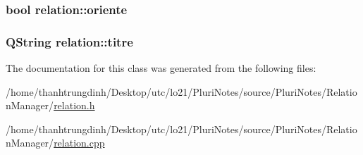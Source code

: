 \subsubsection[{\texorpdfstring{oriente}{oriente}}]{\setlength{\rightskip}{0pt plus 5cm}bool relation\+::oriente\hspace{0.3cm}{\ttfamily [protected]}}\hypertarget{classrelation_a7d9c025d5947d26494321d97049c2bc2}{}\label{classrelation_a7d9c025d5947d26494321d97049c2bc2}
\subsubsection[{\texorpdfstring{titre}{titre}}]{\setlength{\rightskip}{0pt plus 5cm}Q\+String relation\+::titre\hspace{0.3cm}{\ttfamily [protected]}}\hypertarget{classrelation_a6258e8bb61b74f21f592830d0c252524}{}\label{classrelation_a6258e8bb61b74f21f592830d0c252524}


The documentation for this class was generated from the following files\+:\begin{DoxyCompactItemize}
\item 
/home/thanhtrungdinh/\+Desktop/utc/lo21/\+Pluri\+Notes/source/\+Pluri\+Notes/\+Relation\+Manager/\hyperlink{relation_8h}{relation.\+h}\item 
/home/thanhtrungdinh/\+Desktop/utc/lo21/\+Pluri\+Notes/source/\+Pluri\+Notes/\+Relation\+Manager/\hyperlink{relation_8cpp}{relation.\+cpp}\end{DoxyCompactItemize}
